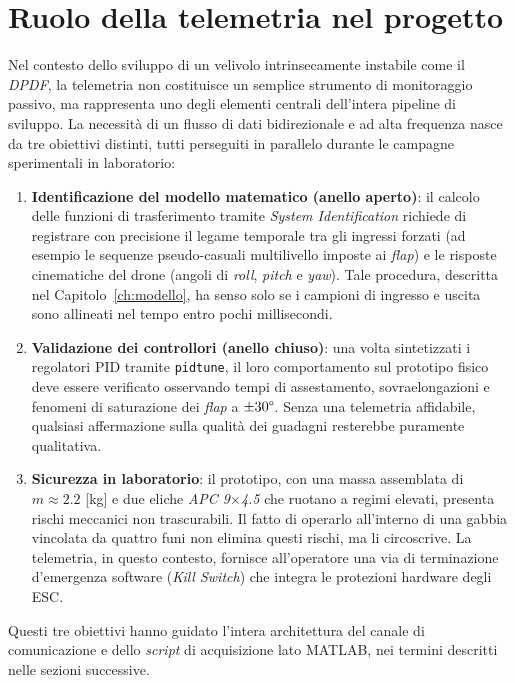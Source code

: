 \documentclass[11pt]{report}
\begin{document}
	\section{Ruolo della telemetria nel progetto}
	\label{sec:ruolo_telemetria}
	
	Nel contesto dello sviluppo di un velivolo intrinsecamente instabile come il \textit{DPDF}, la telemetria non costituisce un semplice strumento di monitoraggio passivo, ma rappresenta uno degli elementi centrali dell'intera pipeline di sviluppo. La necessità di un flusso di dati bidirezionale e ad alta frequenza nasce da tre obiettivi distinti, tutti perseguiti in parallelo durante le campagne sperimentali in laboratorio:
	\begin{enumerate}
		\item \textbf{Identificazione del modello matematico (anello aperto)}: il calcolo delle funzioni di trasferimento tramite \textit{System Identification} richiede di registrare con precisione il legame temporale tra gli ingressi forzati (ad esempio le sequenze pseudo-casuali multilivello imposte ai \textit{flap}) e le risposte cinematiche del drone (angoli di \textit{roll}, \textit{pitch} e \textit{yaw}). Tale procedura, descritta nel Capitolo~\ref{ch:modello}, ha senso solo se i campioni di ingresso e uscita sono allineati nel tempo entro pochi millisecondi.
		\item \textbf{Validazione dei controllori (anello chiuso)}: una volta sintetizzati i regolatori PID tramite \texttt{pidtune}, il loro comportamento sul prototipo fisico deve essere verificato osservando tempi di assestamento, sovraelongazioni e fenomeni di saturazione dei \textit{flap} a $\pm 30\degree$. Senza una telemetria affidabile, qualsiasi affermazione sulla qualità dei guadagni resterebbe puramente qualitativa.
		\item \textbf{Sicurezza in laboratorio}: il prototipo, con una massa assemblata di $m \approx 2.2$ [kg] e due eliche \textit{APC 9$\times$4.5} che ruotano a regimi elevati, presenta rischi meccanici non trascurabili. Il fatto di operarlo all'interno di una gabbia vincolata da quattro funi non elimina questi rischi, ma li circoscrive. La telemetria, in questo contesto, fornisce all'operatore una via di terminazione d'emergenza software (\textit{Kill Switch}) che integra le protezioni hardware degli ESC.
	\end{enumerate}
	Questi tre obiettivi hanno guidato l'intera architettura del canale di comunicazione e dello \textit{script} di acquisizione lato MATLAB, nei termini descritti nelle sezioni successive.
	
\end{document}
